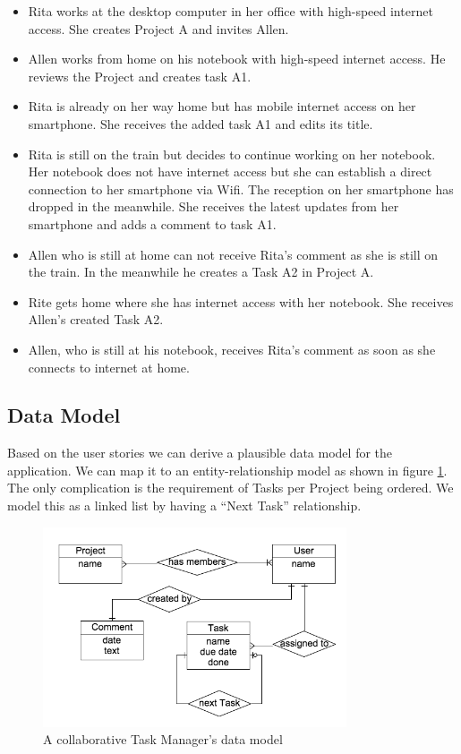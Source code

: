 \begin{itemize}
\item Rita works at the desktop computer in her office with high-speed internet access. She creates Project A and invites Allen.
\item Allen works from home on his notebook with high-speed internet access. He reviews the Project and creates task A1.
\item Rita is already on her way home but has mobile internet access on her smartphone. She receives the added task A1 and edits its title.
\item Rita is still on the train but decides to continue working on her notebook. Her notebook does not have internet access but she can establish a direct connection to her smartphone via Wifi. The reception on her smartphone has dropped in the meanwhile. She receives the latest updates from her smartphone and adds a comment to task A1.
\item Allen who is still at home can not receive Rita's comment as she is still on the train. In the meanwhile he creates a Task A2 in Project A.
\item Rite gets home where she has internet access with her notebook. She receives Allen's created Task A2.
\item Allen, who is still at his notebook, receives Rita's comment as soon as she connects to internet at home.
\end{itemize}

\subsection{Data Model}
Based on the user stories we can derive a plausible data model for the application. We can map it to an entity-relationship model as shown in figure \ref{fig:tasks-data-model}.\\
The only complication is the requirement of Tasks per Project being ordered. We model this as a linked list by having a ``Next Task'' relationship.

\begin{figure}[tasks-data-model]
\centering
\includegraphics[width=0.8\textwidth]{img/tasks-schema}
\caption{A collaborative Task Manager's data model}
\label{fig:tasks-data-model}
\end{figure}

